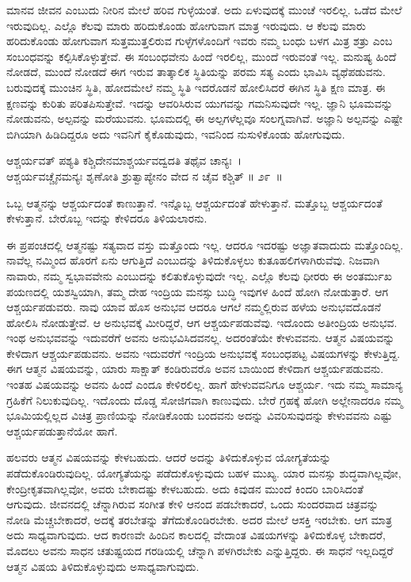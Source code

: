 ಮಾನವ ಜೀವನ ಎಂಬುದು ನೀರಿನ ಮೇಲೆ ಹರಿವ ಗುಳ್ಳೆಯಂತೆ. ಅದು ಏಳುವುದಕ್ಕೆ ಮುಂಚೆ ಇರಲಿಲ್ಲ. ಒಡೆದ ಮೇಲೆ ಇರುವುದಿಲ್ಲ. ಎಲ್ಲೊ ಕೆಲವು ಮಾರು ಹರಿದುಕೊಂಡು ಹೋಗುವಾಗ ಮಾತ್ರ ಇರುವುದು. ಆ ಕೆಲವು ಮಾರು ಹರಿದುಕೊಂಡು ಹೋಗುವಾಗ ಸುತ್ತಮುತ್ತಲಿರುವ ಗುಳ್ಳೆಗಳೊಂದಿಗೆ ಇವರು ನಮ್ಮ ಬಂಧು ಬಳಗ ಮಿತ್ರ ಶತ್ರು ಎಂಬ ಸಂಬಂಧವನ್ನು ಕಲ್ಪಿಸಿಕೊಳ್ಳುತ್ತೇವೆ. ಈ ಸಂಬಂಧವೇನು ಹಿಂದೆ ಇರಲಿಲ್ಲ, ಮುಂದೆ ಇರುವಂತೆ ಇಲ್ಲ. ಮನುಷ್ಯ ಹಿಂದೆ ನೋಡದೆ, ಮುಂದೆ ನೋಡದೆ ಈಗ ಇರುವ ತಾತ್ಕಾಲಿಕ ಸ್ಥಿತಿಯನ್ನು ಪರಮ ಸತ್ಯ ಎಂದು ಭಾವಿಸಿ ವ್ಯಥೆಪಡುವನು. ಬರುವುದಕ್ಕೆ ಮುಂಚಿನ ಸ್ಥಿತಿ, ಹೋದಮೇಲೆ ನಮ್ಮ ಸ್ಥಿತಿ ಇದರೊಡನೆ ಹೋಲಿಸಿದರೆ ಈಗಿನ ಸ್ಥಿತಿ ಕ್ಷಣ ಮಾತ್ರ. ಈ ಕ್ಷಣವನ್ನು ಕುರಿತು ಪರಿತಪಿಸುತ್ತೇವೆ. ಇದನ್ನು ಆವರಿಸಿರುವ ಯುಗವನ್ನು ಗಮನಿಸುವುದೇ ಇಲ್ಲ. ಜ್ಞಾನಿ ಭೂಮವನ್ನು ನೋಡುವನು, ಅಲ್ಪವನ್ನು ಮರೆಯುವನು. ಭೂಮದಲ್ಲಿ ಈ ಅಲ್ಪಗಳೆಲ್ಲವೂ ಸಂಲಗ್ನವಾಗಿವೆ. ಅಜ್ಞಾನಿ ಅಲ್ಪವನ್ನು ಎಷ್ಟೇ ಬಿಗಿಯಾಗಿ ಹಿಡಿದಿದ್ದರೂ ಅದು ಇವನಿಗೆ ಕೈಕೊಡುವುದು, ಇವನಿಂದ ನುಸುಳಿಕೊಂಡು ಹೋಗುವುದು.

\begin{shloka}
ಆಶ್ಚರ್ಯವತ್ ಪಶ್ಯತಿ ಕಶ್ಚಿದೇನಮಾಶ್ಚರ್ಯವದ್ವದತಿ ತಥೈವ ಚಾನ್ಯಃ~।\\ಆಶ್ಚರ್ಯವಚ್ಚೈನಮನ್ಯಃ ಶೃಣೋತಿ ಶ್ರುತ್ವಾಪ್ಯೇನಂ ವೇದ ನ ಚೈವ ಕಶ್ಚಿತ್ \hfill॥ ೨೯~॥
\end{shloka}

\begin{artha}
ಒಬ್ಬ ಆತ್ಮನನ್ನು ಆಶ್ಚರ್ಯದಂತೆ ಕಾಣುತ್ತಾನೆ. ಇನ್ನೊಬ್ಬ ಆಶ್ಚರ್ಯದಂತೆ ಹೇಳುತ್ತಾನೆ. ಮತ್ತೊಬ್ಬ ಆಶ್ಚರ್ಯದಂತೆ ಕೇಳುತ್ತಾನೆ. ಬೇರೊಬ್ಬ ಇದನ್ನು ಕೇಳಿದರೂ ತಿಳಿಯಲಾರನು.
\end{artha}

ಈ ಪ್ರಪಂಚದಲ್ಲಿ ಆತ್ಮನಷ್ಟು ಸತ್ಯವಾದ ವಸ್ತು ಮತ್ತೊಂದು ಇಲ್ಲ. ಆದರೂ ಇದರಷ್ಟು ಅಜ್ಞಾತವಾದುದು ಮತ್ತೊಂದಿಲ್ಲ. ನಾವೆಲ್ಲ ನಮ್ಮಿಂದ ಹೊರಗೆ ಏನು ಆಗುತ್ತಿದೆ ಎಂಬುದನ್ನು ತಿಳಿದುಕೊಳ್ಳಲು ಕುತೂಹಲಿಗಳಾಗಿರುವೆವು. ನಿಜವಾಗಿ ನಾವಾರು, ನಮ್ಮ ಸ್ವಭಾವವೇನು ಎಂಬುದನ್ನು ಕಲಿತುಕೊಳ್ಳುವುದೇ ಇಲ್ಲ. ಎಲ್ಲೊ ಕೆಲವು ಧೀರರು ಈ ಅಂತರ್ಮುಖ ಪಯಣದಲ್ಲಿ ಯಶಸ್ವಿಯಾಗಿ, ತಮ್ಮ ದೇಹ ಇಂದ್ರಿಯ ಮನಸ್ಸು ಬುದ್ಧಿ ಇವುಗಳ ಹಿಂದೆ ಹೋಗಿ ನೋಡುತ್ತಾರೆ. ಆಗ ಆಶ್ಚರ್ಯಪಡುವರು. ನಾವು ಯಾವ ಹೊಸ ಅನುಭವ ಆದರೂ ಆಗಲೆ ನಮ್ಮಲ್ಲಿರುವ ಹಳೆಯ ಅನುಭವದೊಡನೆ ಹೋಲಿಸಿ ನೋಡುತ್ತೇವೆ. ಆ ಅನುಭವಕ್ಕೆ ಮೀರಿದ್ದರೆ, ಆಗ ಆಶ್ಚರ್ಯಪಡುವೆವು. ಇದೊಂದು ಅತೀಂದ್ರಿಯ ಅನುಭವ. ಇಂಥ ಅನುಭವವನ್ನು ಇದುವರೆಗೆ ಅವನು ಅನುಭವಿಸಿದವನಲ್ಲ. ಅದರಂತೆಯೇ ಕೇಳುವವನು. ಆತ್ಮನ ವಿಷಯವನ್ನು ಕೇಳಿದಾಗ ಆಶ್ಚರ್ಯಪಡುವನು. ಅವನು ಇದುವರೆಗೆ ಇಂದ್ರಿಯ ಅನುಭವಕ್ಕೆ ಸಂಬಂಧಪಟ್ಟ ವಿಷಯಗಳನ್ನು ಕೇಳುತ್ತಿದ್ದ. ಈಗ ಆತ್ಮನ ವಿಷಯವನ್ನು, ಯಾರು ಸಾಕ್ಷಾತ್ ಕಂಡಿರುವರೊ ಅವನ ಬಾಯಿಂದ ಕೇಳಿದಾಗ ಆಶ್ಚರ್ಯಪಡುವನು. ಇಂತಹ ವಿಷಯವನ್ನು ಅವನು ಹಿಂದೆ ಎಂದೂ ಕೇಳಿರಲಿಲ್ಲ. ಹಾಗೆ ಹೇಳುವವನಿಗೂ ಆಶ್ಚರ್ಯ. ಇದು ನಮ್ಮ ಸಾಮಾನ್ಯ ಗ್ರಹಿಕೆಗೆ ನಿಲುಕುವುದಿಲ್ಲ. ಇದೊಂದು ದೊಡ್ಡ ಸೋಜಿಗವಾಗಿ ಕಾಣುವುದು. ಬೇರೆ ಗ್ರಹಕ್ಕೆ ಹೋಗಿ ಅಲ್ಲೇನಾದರೂ ನಮ್ಮ ಭೂಮಿಯಲ್ಲಿಲ್ಲದ ವಿಚಿತ್ರ ಪ್ರಾಣಿಯನ್ನು ನೋಡಿಕೊಂಡು ಬಂದವನು ಅದನ್ನು ವಿವರಿಸುವುದನ್ನು ಕೇಳುವವನು ಎಷ್ಟು ಆಶ್ಚರ್ಯಪಡುತ್ತಾನೆಯೋ ಹಾಗೆ.

ಹಲವರು ಆತ್ಮನ ವಿಷಯವನ್ನು ಕೇಳಬಹುದು. ಆದರೆ ಅದನ್ನು ತಿಳಿದುಕೊಳ್ಳುವ ಯೋಗ್ಯತೆಯನ್ನು ಪಡೆದುಕೊಂಡಿರುವುದಿಲ್ಲ. ಯೋಗ್ಯತೆಯನ್ನು ಪಡೆದುಕೊಳ್ಳುವುದು ಬಹಳ ಮುಖ್ಯ. ಯಾರ ಮನಸ್ಸು ಶುದ್ಧವಾಗಿಲ್ಲವೋ, ಕೇಂದ್ರೀಕೃತವಾಗಿಲ್ಲವೋ, ಅವರು ಬೇಕಾದಷ್ಟು ಕೇಳಬಹುದು. ಅದು ಕಿವುಡನ ಮುಂದೆ ಕಿಂದರಿ ಬಾರಿಸಿದಂತೆ ಆಗುವುದು. ಜೀವನದಲ್ಲಿ ಚೆನ್ನಾಗಿರುವ ಸಂಗೀತ ಕೇಳಿ ಆನಂದ ಪಡಬೇಕಾದರೆ, ಒಂದು ಸುಂದರವಾದ ಚಿತ್ರವನ್ನು ನೋಡಿ ಮೆಚ್ಚಬೇಕಾದರೆ, ಅದಕ್ಕೆ ತರಬೇತನ್ನು ತೆಗೆದುಕೊಂಡಿರಬೇಕು. ಅದರ ಮೇಲೆ ಆಸಕ್ತಿ ಇರಬೇಕು. ಆಗ ಮಾತ್ರ ಅದು ಸಾಧ್ಯವಾಗುವುದು. ಆದ ಕಾರಣವೇ ಹಿಂದಿನ ಕಾಲದಲ್ಲಿ ವೇದಾಂತ ವಿಷಯಗಳನ್ನು ತಿಳಿದುಕೊಳ್ಳ ಬೇಕಾದರೆ, ಮೊದಲು ಅವನು ಸಾಧನ ಚತುಷ್ಟಯದ ಗರಡಿಯಲ್ಲಿ ಚೆನ್ನಾಗಿ ಪಳಗಿರಬೇಕು ಎನ್ನುತ್ತಿದ್ದರು. ಈ ಸಾಧನೆ ಇಲ್ಲದಿದ್ದರೆ ಆತ್ಮನ ವಿಷಯ ತಿಳಿದುಕೊಳ್ಳುವುದು ಅಸಾಧ್ಯವಾಗುವುದು.

